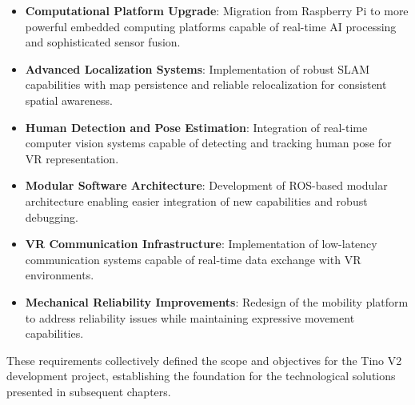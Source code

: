\begin{itemize}
\item \textbf{Computational Platform Upgrade}: Migration from Raspberry Pi to more powerful embedded computing platforms capable of real-time AI processing and sophisticated sensor fusion.

\item \textbf{Advanced Localization Systems}: Implementation of robust SLAM capabilities with map persistence and reliable relocalization for consistent spatial awareness.

\item \textbf{Human Detection and Pose Estimation}: Integration of real-time computer vision systems capable of detecting and tracking human pose for VR representation.

\item \textbf{Modular Software Architecture}: Development of ROS-based modular architecture enabling easier integration of new capabilities and robust debugging.

\item \textbf{VR Communication Infrastructure}: Implementation of low-latency communication systems capable of real-time data exchange with VR environments.

\item \textbf{Mechanical Reliability Improvements}: Redesign of the mobility platform to address reliability issues while maintaining expressive movement capabilities.
\end{itemize}

These requirements collectively defined the scope and objectives for the Tino V2 development project, establishing the foundation for the technological solutions presented in subsequent chapters.

